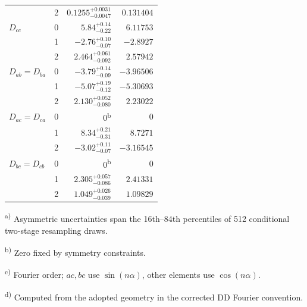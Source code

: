 \begin{table}
\begin{tabular}{@{}lcrr@{}}
 & 2 & ${0.1255}_{-0.0047}^{+0.0031}$ & $0.131404$\\
$D_{cc}$ & 0 & ${5.84}_{-0.22}^{+0.14}$ & $6.11753$\\
 & 1 & ${-2.76}_{-0.07}^{+0.10}$ & $-2.8927$\\
 & 2 & ${2.464}_{-0.092}^{+0.061}$ & $2.57942$\\
$D_{ab}=D_{ba}$ & 0 & ${-3.79}_{-0.09}^{+0.14}$ & $-3.96506$\\
 & 1 & ${-5.07}_{-0.12}^{+0.19}$ & $-5.30693$\\
 & 2 & ${2.130}_{-0.080}^{+0.052}$ & $2.23022$\\
$D_{ac}=D_{ca}$ & 0 & $0$\textsuperscript{b} & $0$\\
 & 1 & ${8.34}_{-0.31}^{+0.21}$ & $8.7271$\\
 & 2 & ${-3.02}_{-0.07}^{+0.11}$ & $-3.16545$\\
$D_{bc}=D_{cb}$ & 0 & $0$\textsuperscript{b} & $0$\\
 & 1 & ${2.305}_{-0.086}^{+0.057}$ & $2.41331$\\
 & 2 & ${1.049}_{-0.039}^{+0.026}$ & $1.09829$\\
\bottomrule
\end{tabular}
\endgroup

\par\vspace{3pt}
\begin{minipage}{\linewidth}
\footnotesize\raggedright
\textsuperscript{a)} Asymmetric uncertainties span the 16th--84th percentiles of 512 conditional two-stage resampling draws.\par
\textsuperscript{b)} Zero fixed by symmetry constraints.\par
\textsuperscript{c)} Fourier order; $ac,bc$ use $\sin(n\alpha)$, other elements use $\cos(n\alpha)$.\par
\textsuperscript{d)} Computed from the adopted geometry in the corrected DD Fourier convention.\par
\end{minipage}
\par\endgroup
\end{table}
